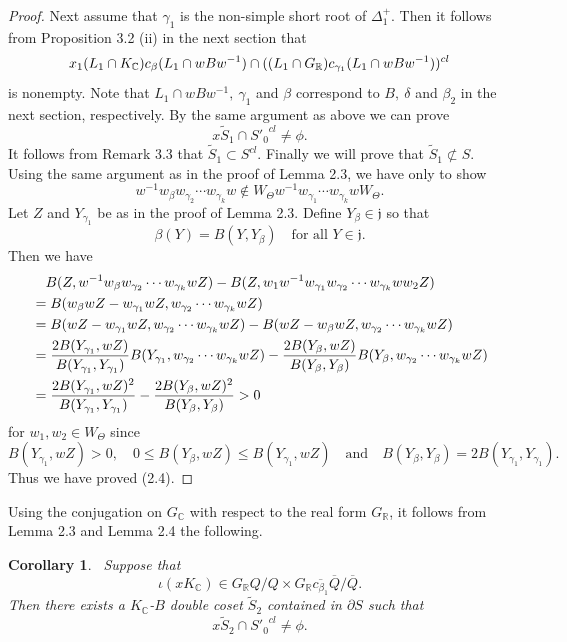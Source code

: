 \documentclass[12pt,a4paper]{amsart}
\def\frak{\mathfrak}
\newtheorem{corollary}[theorem]{Corollary}
\theoremstyle{definition}
\theoremstyle{remark}
\numberwithin{equation}{section}
\def\br{\mathbb R}
\def\bc{\mathbb C}
\def\mand{\quad\mbox{and}\quad}
\def\p{\partial}
\begin{document}
\begin{proof}
Next assume that $\gamma_1$ is the non-simple short root of $\Delta_1^+$. Then it follows from Proposition 3.2 (ii) in the next section that
\begin{equation}
x_1(L_1\cap K_\bc)c_\beta(L_1\cap wBw^{-1})\cap ((L_1\cap G_\br)c_{\gamma_1}(L_1\cap wBw^{-1}))^{cl} \notag
\end{equation}
is nonempty. Note that $L_1\cap wBw^{-1},\ \gamma_1$ and $\beta$ correspond to $B,\ \delta$ and $\beta_2$ in the next section, respectively. By the same argument as above we can prove
$$x\widetilde{S}_1\cap {S'_0}^{cl}\ne\phi.$$
It follows from Remark 3.3 that $\widetilde{S}_1\subset S^{cl}$. Finally we will prove that $\widetilde{S}_1\not\subset S$. Using the same argument as in the proof of Lemma 2.3, we have only to show
\begin{equation}
w^{-1}w_\beta w_{\gamma_2}\cdots w_{\gamma_k}w\notin W_\Theta w^{-1}w_{\gamma_1}\cdots w_{\gamma_k}wW_\Theta. \tag{2.4}
\end{equation}
Let $Z$ and $Y_{\gamma_1}$ be as  in the proof of Lemma 2.3. Define $Y_\beta\in \frak{j}$ so that
$$\beta(Y)=B(Y,Y_\beta)\quad\mbox{for all }Y\in\frak{j}.$$
Then we have
\begin{align*}
& \quad B(Z,w^{-1}w_\beta w_{\gamma_2}\cdots w_{\gamma_k}wZ)- B(Z,w_1w^{-1}w_{\gamma_1}w_{\gamma_2}\cdots w_{\gamma_k}ww_2Z) \\
& =B(w_\beta wZ-w_{\gamma_1}wZ,w_{\gamma_2}\cdots w_{\gamma_k}wZ) \\
& =B(wZ-w_{\gamma_1}wZ,w_{\gamma_2}\cdots w_{\gamma_k}wZ)
-B(wZ-w_\beta wZ,w_{\gamma_2}\cdots w_{\gamma_k}wZ) \\
& ={2B(Y_{\gamma_1},wZ)\over B(Y_{\gamma_1},Y_{\gamma_1})}B(Y_{\gamma_1}, w_{\gamma_2}\cdots w_{\gamma_k}wZ) -{2B(Y_\beta,wZ)\over B(Y_\beta,Y_\beta)}B(Y_\beta, w_{\gamma_2}\cdots w_{\gamma_k}wZ)  \\
& ={2B(Y_{\gamma_1},wZ)^2\over B(Y_{\gamma_1},Y_{\gamma_1})} -{2B(Y_\beta,wZ)^2\over B(Y_\beta,Y_\beta)} >0
\end{align*}
for $w_1,w_2\in W_\Theta$ since
$$B(Y_{\gamma_1},wZ)>0,\quad 0\le B(Y_\beta,wZ)\le B(Y_{\gamma_1},wZ)\mand B(Y_\beta,Y_\beta)=2B(Y_{\gamma_1},Y_{\gamma_1}).$$
Thus we have proved (2.4).
\end{proof}

Using the conjugation on $G_\bc$ with respect to the real form $G_\br$, it follows from Lemma 2.3 and Lemma 2.4 the following.

\begin{corollary} \ Suppose that 
$$\iota(xK_\bc)\in G_\br Q/Q\times G_\br\overline{c_{\beta_1}}\overline{Q}/\overline{Q}.$$
Then there exists a $K_\bc$-$B$ double coset $\widetilde{S}_2$ contained in $\p S$ such that
$$x\widetilde{S}_2\cap {S'_0}^{cl}\ne\phi.$$
\end{corollary}
\end{document}
